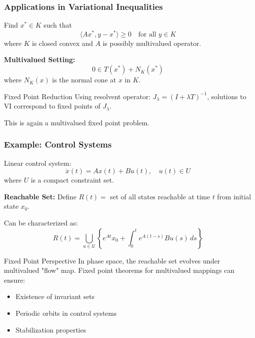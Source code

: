 \documentclass[aspectratio=169,10pt]{beamer}
\begin{document}
\begin{frame}
\frametitle{Applications in Variational Inequalities}

\begin{problem}
Find $x^* \in K$ such that
\[
\langle Ax^*, y - x^* \rangle \geq 0 \quad \text{for all } y \in K
\]
where $K$ is closed convex and $A$ is possibly multivalued operator.
\end{problem}

\vspace{0.3cm}

\textbf{Multivalued Setting:}
\[
0 \in T(x^*) + N_K(x^*)
\]
where $N_K(x)$ is the normal cone at $x$ in $K$.

\vspace{0.3cm}

\begin{block}{Fixed Point Reduction}
Using resolvent operator: $J_\lambda = (I + \lambda T)^{-1}$, solutions to VI correspond to
fixed points of $J_\lambda$.

This is again a multivalued fixed point problem.
\end{block}

\end{frame}

\begin{frame}
\frametitle{Example: Control Systems}

\begin{problem}
Linear control system:
\[
\dot{x}(t) = Ax(t) + Bu(t), \quad u(t) \in U
\]
where $U$ is a compact constraint set.
\end{problem}

\vspace{0.3cm}

\textbf{Reachable Set:}
Define $R(t) = $ set of all states reachable at time $t$ from initial state $x_0$.

Can be characterized as:
\[
R(t) = \bigcup_{u \in \mathcal{U}} \left\{e^{At}x_0 + \int_0^t e^{A(t-s)}Bu(s) \, ds\right\}
\]

\vspace{0.3cm}

\begin{block}{Fixed Point Perspective}
In phase space, the reachable set evolves under multivalued "flow" map.
Fixed point theorems for multivalued mappings can ensure:
\begin{itemize}
    \item Existence of invariant sets
    \item Periodic orbits in control systems
    \item Stabilization properties
\end{itemize}
\end{block}

\end{frame}
\end{document}
